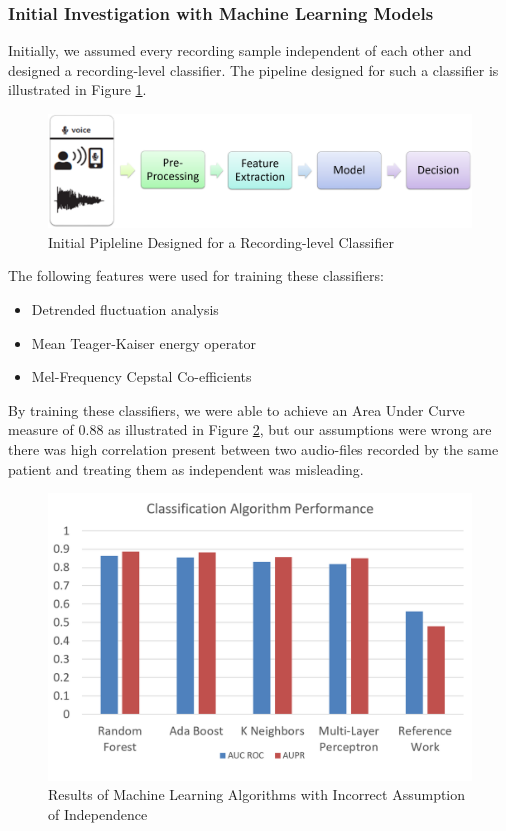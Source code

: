\subsubsection{Initial Investigation with Machine Learning Models}
Initially, we assumed every recording sample independent of each other and designed a recording-level classifier. The pipeline designed for such a classifier is illustrated in Figure \ref{fig:park_pipeline}.
\begin{figure}[htbp]
  \centering
  \includegraphics[width=\textwidth]{./Figures/park_pipeline.png}
  \caption{Initial Pipleline Designed for a Recording-level Classifier}
  \label{fig:park_pipeline}
\end{figure}
The following features were used for training these classifiers:
\begin{itemize}
\item Detrended fluctuation analysis \cite{arora2015detecting}
\item Mean Teager-Kaiser energy operator \cite{arora2015detecting}
\item Mel-Frequency Cepstal Co-efficients \cite{arora2015detecting}
\end{itemize}
By training these classifiers, we were able to achieve an Area Under Curve measure of 0.88 as illustrated in Figure \ref{fig:park_ini_res}, but our assumptions were wrong are there was high correlation present between two  audio-files recorded by the same patient and treating them as independent was misleading.
\begin{figure}[htbp]
  \centering
  \includegraphics[width=\textwidth]{./Figures/park_ini_res.png}
  \caption{Results of Machine Learning Algorithms with Incorrect Assumption of Independence}
  \label{fig:park_ini_res}
\end{figure}

